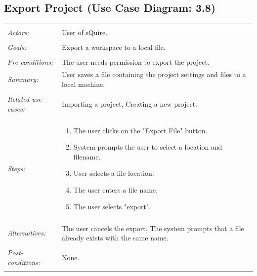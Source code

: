 \documentclass[11pt]{report}
\begin{document}
\subsection{Export Project (Use Case Diagram: 3.8)}
\begin{tabular}{ p{2cm} p{12cm} }
\hline
\\
\textit{Actors:} & User of sQuire.\\
\\
\textit{Goals:} & Export a workspace to a local file. \\
\\
\textit{Pre-conditions:} & The user needs permission to export the project. 
\\
\textit{Summary:} & User saves a file containing the project settings and files to a local machine. \\
\\
\textit{Related use cases:} & Importing a project, Creating a new project. \\
\\
\textit{Steps:} & \begin{enumerate}
 \item The user clicks on the "Export File" button. 
 \item System prompts the user to select a location and filename. 
 \item User selects a file location.
 \item The user enters a file name.
 \item The user selects "export". 
 \end{enumerate}\\
 \\
 \textit{Alternatives:} & The user cancels the export, The system prompts that a file already exists with the same name.\\
 \\
 \textit{Post-conditions:} & None. \\
 \\
\hline
\end{tabular}
\end{document}
